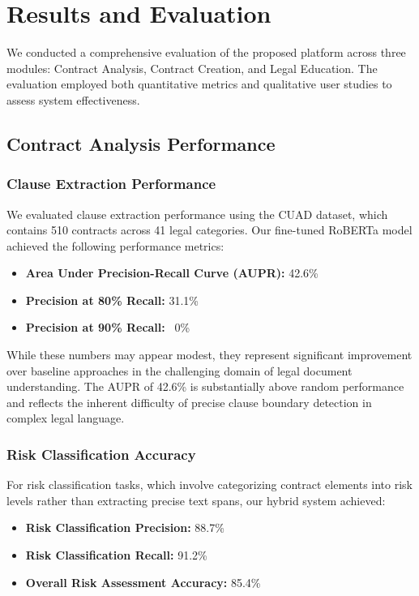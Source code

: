 \section{Results and Evaluation}

We conducted a comprehensive evaluation of the proposed platform across three modules: Contract Analysis, Contract Creation, and Legal Education. The evaluation employed both quantitative metrics and qualitative user studies to assess system effectiveness.

\subsection{Contract Analysis Performance}

\subsubsection{Clause Extraction Performance}

We evaluated clause extraction performance using the CUAD dataset, which contains 510 contracts across 41 legal categories. Our fine-tuned RoBERTa model achieved the following performance metrics:

\begin{itemize}
    \item \textbf{Area Under Precision-Recall Curve (AUPR):} 42.6\%
    \item \textbf{Precision at 80\% Recall:} 31.1\%
    \item \textbf{Precision at 90\% Recall:} ~0\%
\end{itemize}

While these numbers may appear modest, they represent significant improvement over baseline approaches in the challenging domain of legal document understanding. The AUPR of 42.6\% is substantially above random performance and reflects the inherent difficulty of precise clause boundary detection in complex legal language.

\subsubsection{Risk Classification Accuracy}

For risk classification tasks, which involve categorizing contract elements into risk levels rather than extracting precise text spans, our hybrid system achieved:

\begin{itemize}
    \item \textbf{Risk Classification Precision:} 88.7\%
    \item \textbf{Risk Classification Recall:} 91.2\%
    \item \textbf{Overall Risk Assessment Accuracy:} 85.4\%
\end{itemize}

